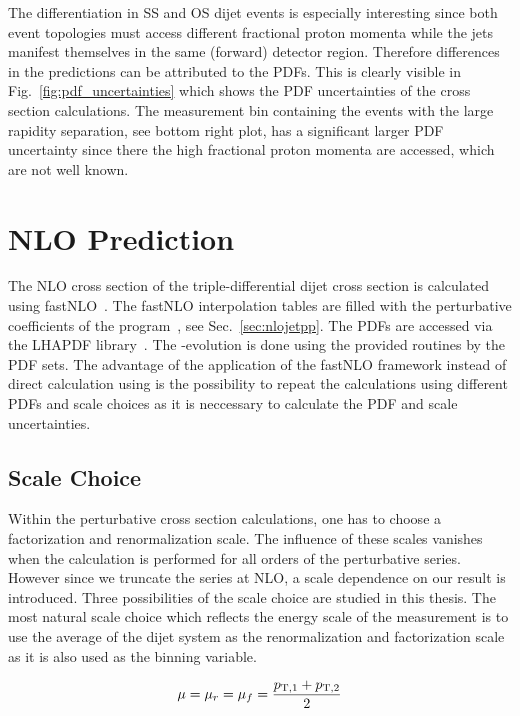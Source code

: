 The differentiation in SS and OS dijet events is especially interesting since
both event topologies must access different fractional proton momenta while the
jets manifest themselves in the same (forward) detector region. Therefore
differences in the predictions can be attributed to the PDFs. This is clearly
visible in Fig.~\ref{fig:pdf_uncertainties} which shows the PDF uncertainties of
the cross section calculations. The measurement bin containing the events with
the large rapidity separation, see bottom right plot, has a significant larger
PDF uncertainty since there the high fractional proton momenta are accessed,
which are not well known.

\section{NLO Prediction}

The NLO cross section of the triple-differential dijet cross section is
calculated using fastNLO~\cite{Kluge:2006xs,Britzger:2012bs}. The fastNLO interpolation tables are
filled with the perturbative coefficients of the \NLOJETPP program~\cite{Nagy:2003tz}, see
Sec.~\ref{sec:nlojetpp}. The PDFs are accessed via the LHAPDF
library~\cite{lhapdf}. The \as-evolution is done using the provided routines
by the PDF sets. The advantage of the application of the fastNLO framework
instead of direct calculation using \NLOJETPP is the possibility to repeat the
calculations using different PDFs and scale choices as it is neccessary to
calculate the PDF and scale uncertainties.

\subsection{Scale Choice}

Within the perturbative cross section calculations, one has to choose a
factorization and renormalization scale. The influence of these scales vanishes
when the calculation is performed for all orders of the perturbative series.
However since we truncate the series at NLO, a scale dependence on our result is
introduced. Three possibilities of the scale choice are studied in this thesis.
The most natural scale choice which reflects the energy scale of the measurement
is to use the average \pt of the dijet system as the renormalization and
factorization scale as it is also used as the binning variable. 

\begin{equation*}
    \mu = \mu_r = \mu_f = \frac{p_{\mathrm{T},1} + p_{\mathrm{T},2}}{2}
\end{equation*}

